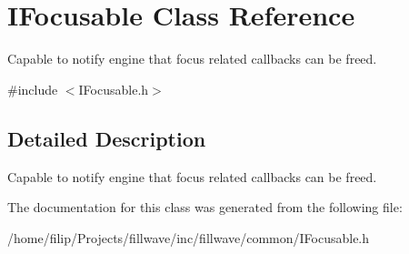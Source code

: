 \hypertarget{classIFocusable}{}\section{I\+Focusable Class Reference}
\label{classIFocusable}


Capable to notify engine that focus related callbacks can be freed.  




{\ttfamily \#include $<$I\+Focusable.\+h$>$}



\subsection{Detailed Description}
Capable to notify engine that focus related callbacks can be freed. 

The documentation for this class was generated from the following file\+:\begin{DoxyCompactItemize}
\item 
/home/filip/\+Projects/fillwave/inc/fillwave/common/I\+Focusable.\+h\end{DoxyCompactItemize}
